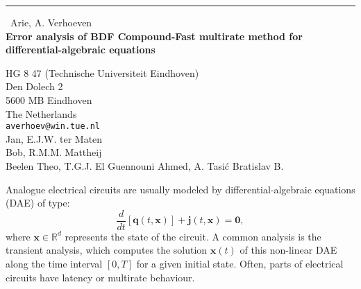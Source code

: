 \documentclass{report}
\begin{document}
\begin{center}
\rule{6in}{1pt} \
{\large Arie, A. Verhoeven \\
{\bf Error analysis of BDF Compound-Fast multirate method for differential-algebraic equations}}

HG 8 47 (Technische Universiteit Eindhoven) \\ Den Dolech 2 \\ 5600 MB Eindhoven \\ The Netherlands
\\
{\tt averhoev@win.tue.nl}\\
Jan, E.J.W. ter Maten\\
Bob, R.M.M.  Mattheij\\
	Beelen        Theo,      T.G.J.
	El Guennouni  Ahmed,     A.
	Tasi\'c       Bratislav  B.\end{center}

Analogue electrical circuits are usually modeled by differential-algebraic
equations (DAE) of type:
\begin{equation}\label{daeqj}\frac{d}{dt}\left[\mathbf{q}(t,\mathbf{x})\right]+\mathbf{j}(t,\mathbf{x})=\mathbf{0},\end{equation}
where $\mathbf{x} \in \mathbb{R}^d$ represents the state of the circuit.
A common analysis is the transient analysis, which computes the solution
$\mathbf{x}(t)$ of this non-linear DAE along the time interval
$[0,T]$ for a given initial state.
Often, parts of electrical circuits have latency or multirate behaviour.
\end{document}

